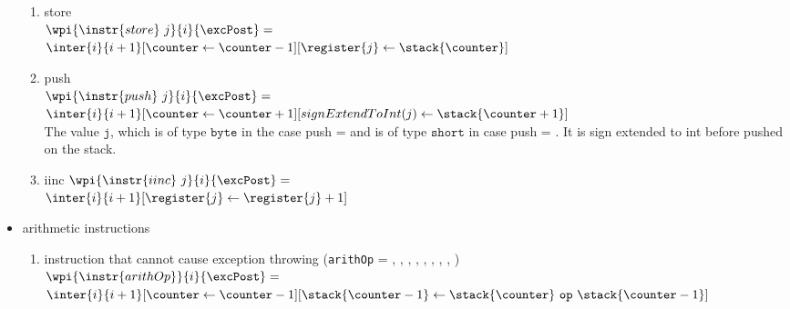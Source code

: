 \begin{itemize}
\begin{enumerate}
		\item store	 \\	 
		$\wpi{\instr{store } \ j} {i} {\excPost}  =   $ \\ 
	$	\inter{i}{i+1}[\counter \leftarrow \counter   - 1][  \register{j} \leftarrow \stack{ \counter }   ]$ \\
		
		\item push  \\
			$\wpi{\instr{push } \ j} {i} {\excPost}  =   $ \\ 
	$	\inter{i}{i+1}[\counter \leftarrow \counter   + 1][  signExtendToInt(j) \leftarrow \stack{ \counter +1 }   ]$ \\
		
		The value $\texttt{j}$, which is of type $\texttt{byte}$  in the case push =  and is of type $\texttt{short}$  in case 
		push = . It is sign extended to int  before pushed on the stack. 
	

		\item iinc 
				$\wpi{\instr{iinc } \ j} {i} {\excPost}   = $ \\
				$ \inter{i}{i+1}[ \register{j} \leftarrow \register{j} + 1   ] $
		  
	\end{enumerate}
	
\item arithmetic instructions
	\begin{enumerate}
		\item instruction that cannot  cause exception throwing    (\texttt{arithOp} =  , , , 
				, ,  , , ,     )\\
				$\wpi{\instr{arithOp}} {i} {\excPost}   = $ \\
				$ \inter{i}{i+1}[\counter \leftarrow \counter   - 1][ \stack{\counter - 1} \leftarrow  \stack{\counter} \ \texttt{op} \ \stack{\counter -1}   ] $

	
						

\end{enumerate}
\end{itemize}
